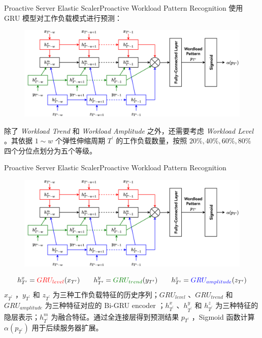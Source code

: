 \documentclass[aspectratio=169]{beamer}
\begin{document}
\begin{frame}{Proactive Server Elastic Scaler}{Proactive Workload Pattern Recognition}
  使用 GRU 模型对工作负载模式进行预测：
  \begin{figure}
    \centering
    \includegraphics[height=0.55\textheight]{img/method/gru.pdf}
  \end{figure}
  除了 \textit{Workload Trend} 和 \textit{Workload Amplitude} 之外，还需要考虑 \textit{Workload Level} 。其依据 $1 \sim w$ 个弹性伸缩周期 $T^\prime$ 的工作负载数量，按照 $20\%, 40\%, 60\%, 80\%$ 四个分位点划分为五个等级。
\end{frame}

\begin{frame}{Proactive Server Elastic Scaler}{Proactive Workload Pattern Recognition}
  \begin{figure}
    \centering
    \includegraphics[height=0.55\textheight]{img/method/gru.pdf}
  \end{figure}
  \begin{equation*}
    h_{T^\prime}^x = \textcolor{red}{GRU_{level}}(x_{T^\prime}) \qquad
    h_{T^\prime}^y = \textcolor[rgb]{0,0.5,0}{GRU_{trend}}(y_{T^\prime}) \qquad
    h_{T^\prime}^z = \textcolor{blue}{GRU_{amplitude}}(z_{T^\prime})
  \end{equation*}
  $x_{T^\prime}$ ，$y_{T^\prime}$ 和 $z_{T^\prime}$ 为三种工作负载特征的历史序列；$GRU_{level}$ 、$GRU_{trend}$ 和 $GRU_{amplitude}$ 为三种特征对应的 Bi-GRU encoder ；$h_{T^\prime}^x$ 、$h_{T^\prime}^y$ 和 $h_{T^\prime}^z$ 为三种特征的隐层表示；$h_{T^\prime}^m$ 为融合特征。通过全连接层得到预测结果 $p_{T^\prime}$ ，Sigmoid 函数计算 $\alpha (p_{T^\prime})$ 用于后续服务器扩展。
\end{frame}
\end{document}
